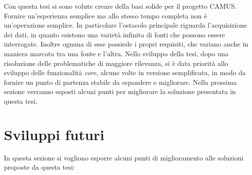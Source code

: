 Con questa tesi si sono volute creare della basi solide per il progetto CAMUS. Fornire un'esperienza semplice ma allo stesso tempo completa non è un'operazione semplice. In particolare l'ostacolo principale riguarda l'acquisizione dei dati, in quanto esistono una varietà infinita di fonti che possono essere interrogate. Inoltre ognuna di esse possiede i propri requisiti, che variano anche in maniera marcata tra una fonte e l'altra. Nello sviluppo della tesi, dopo una risoluzione delle problematiche di maggiore rilevanza, si è data priorità allo sviluppo delle funzionalità \emph{core}, alcune volte in versione semplificata, in modo da fornire un punto di partenza stabile da espandere e migliorare. Nella prossima sezione verranno esposti alcuni punti per migliorare la soluzione presentata in questa tesi.

\section{Sviluppi futuri}

In questa sezione si vogliono esporre alcuni punti di miglioramento alle soluzioni proposte da questa tesi:

